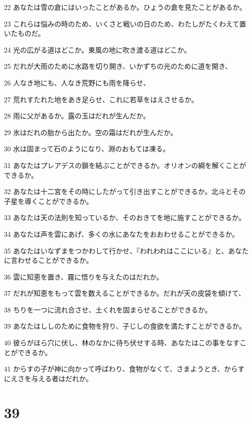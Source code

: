 \par 22 あなたは雪の倉にはいったことがあるか。ひょうの倉を見たことがあるか。
\par 23 これらは悩みの時のため、いくさと戦いの日のため、わたしがたくわえて置いたものだ。
\par 24 光の広がる道はどこか。東風の地に吹き渡る道はどこか。
\par 25 だれが大雨のために水路を切り開き、いかずちの光のために道を開き、
\par 26 人なき地にも、人なき荒野にも雨を降らせ、
\par 27 荒れすたれた地をあき足らせ、これに若草をはえさせるか。
\par 28 雨に父があるか。露の玉はだれが生んだか。
\par 29 氷はだれの胎から出たか。空の霜はだれが生んだか。
\par 30 水は固まって石のようになり、淵のおもては凍る。
\par 31 あなたはプレアデスの鎖を結ぶことができるか。オリオンの綱を解くことができるか。
\par 32 あなたは十二宮をその時にしたがって引き出すことができるか。北斗とその子星を導くことができるか。
\par 33 あなたは天の法則を知っているか、そのおきてを地に施すことができるか。
\par 34 あなたは声を雲にあげ、多くの水にあなたをおおわせることができるか。
\par 35 あなたはいなずまをつかわして行かせ、『われわれはここにいる』と、あなたに言わせることができるか。
\par 36 雲に知恵を置き、霧に悟りを与えたのはだれか。
\par 37 だれが知恵をもって雲を数えることができるか。だれが天の皮袋を傾けて、
\par 38 ちりを一つに流れ合させ、土くれを固まらせることができるか。
\par 39 あなたはししのために食物を狩り、子じしの食欲を満たすことができるか。
\par 40 彼らがほら穴に伏し、林のなかに待ち伏せする時、あなたはこの事をなすことができるか。
\par 41 からすの子が神に向かって呼ばわり、食物がなくて、さまようとき、からすにえさを与える者はだれか。

\chapter{39}

